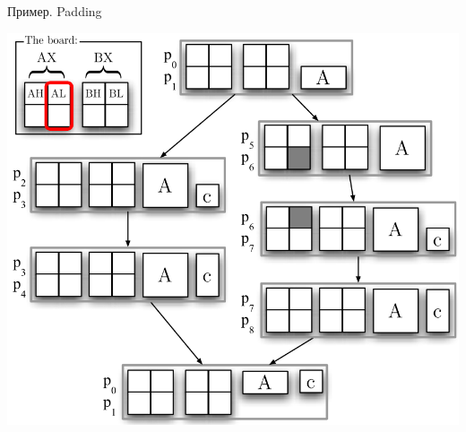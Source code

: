 \documentclass[aspectratio=169
  , xcolor={svgnames}
  , hyperref={ colorlinks,citecolor=DeepPink4
             , linkcolor=DarkRed,urlcolor=DarkBlue}
  , russian
  ]{beamer}
\theoremstyle{exerciseStyle1}
\begin{document}
\begin{frame}[fragile]{Пример. Padding}
\begin{minipage}{.48\textwidth}
\begin{center}
\includegraphics[width=1\linewidth]{figures/dummyname1}
\end{center}
\end{minipage}
\end{frame}
\end{document}
